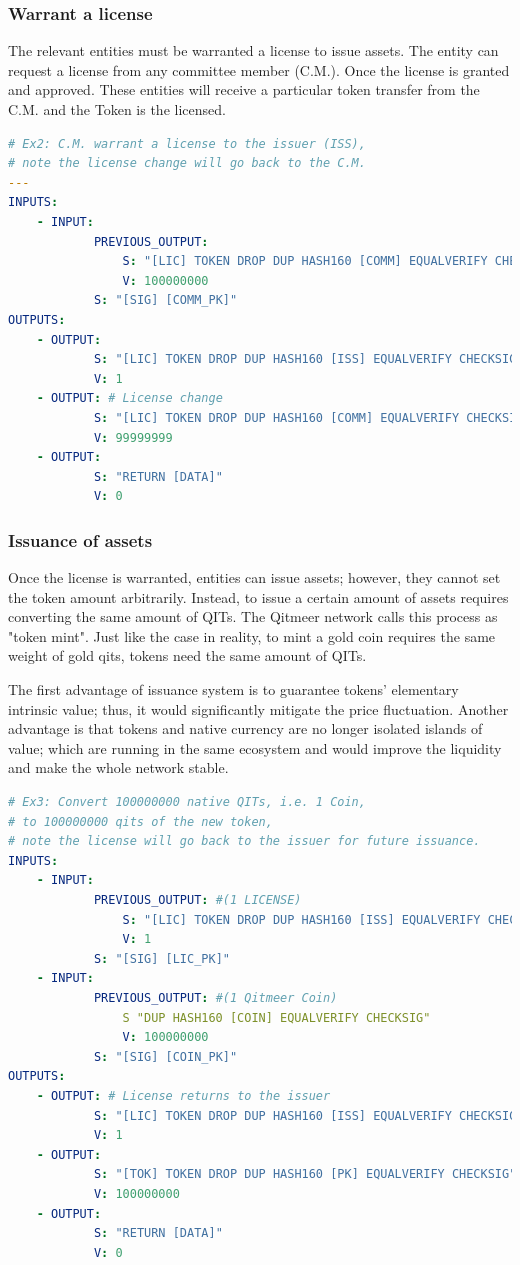 \documentclass[a4paper,11pt]{article}
\begin{document}
\subsubsection{Warrant a license}

The relevant entities must be warranted a license to issue assets. The entity can request a license from any committee member (C.M.). Once the license is granted and approved. These entities will receive a particular token transfer from the C.M. and the Token is the licensed.

\lstset{basicstyle=\tiny,style=myListStyle}
\begin{lstlisting}[language=yaml, numbers=none,basicstyle=\footnotesize]
# Ex2: C.M. warrant a license to the issuer (ISS),
# note the license change will go back to the C.M.
---
INPUTS:
	- INPUT:
			PREVIOUS_OUTPUT:
				S: "[LIC] TOKEN DROP DUP HASH160 [COMM] EQUALVERIFY CHECKSIG"
				V: 100000000
			S: "[SIG] [COMM_PK]"
OUTPUTS:
	- OUTPUT:
			S: "[LIC] TOKEN DROP DUP HASH160 [ISS] EQUALVERIFY CHECKSIG"
			V: 1
	- OUTPUT: # License change
			S: "[LIC] TOKEN DROP DUP HASH160 [COMM] EQUALVERIFY CHECKSIG"
			V: 99999999
	- OUTPUT:
			S: "RETURN [DATA]"
			V: 0
\end{lstlisting}

\subsubsection{Issuance of assets}
Once the license is warranted, entities can issue assets; however, they cannot set the token amount arbitrarily. Instead, to issue a certain amount of assets requires converting the same amount of QITs. The Qitmeer network calls this process as "token mint". Just like the case in reality, to mint a gold coin requires the same weight of gold qits, tokens need the same amount of QITs.

The first advantage of issuance system is to guarantee tokens’ elementary intrinsic value; thus, it would significantly mitigate the price fluctuation. Another advantage is that tokens and native currency are no longer isolated islands of value; which are running in the same ecosystem and would improve the liquidity and make the whole network stable.

\lstset{basicstyle=\tiny,style=myListStyle}
\begin{lstlisting}[language=yaml, numbers=none,basicstyle=\footnotesize]
# Ex3: Convert 100000000 native QITs, i.e. 1 Coin,
# to 100000000 qits of the new token,
# note the license will go back to the issuer for future issuance.
INPUTS:
	- INPUT:
			PREVIOUS_OUTPUT: #(1 LICENSE)
				S: "[LIC] TOKEN DROP DUP HASH160 [ISS] EQUALVERIFY CHECKSIG"
				V: 1
			S: "[SIG] [LIC_PK]"
	- INPUT:
			PREVIOUS_OUTPUT: #(1 Qitmeer Coin)
				S "DUP HASH160 [COIN] EQUALVERIFY CHECKSIG"
				V: 100000000
			S: "[SIG] [COIN_PK]"
OUTPUTS:
	- OUTPUT: # License returns to the issuer
			S: "[LIC] TOKEN DROP DUP HASH160 [ISS] EQUALVERIFY CHECKSIG"
			V: 1
	- OUTPUT:
			S: "[TOK] TOKEN DROP DUP HASH160 [PK] EQUALVERIFY CHECKSIG"
			V: 100000000
	- OUTPUT:
			S: "RETURN [DATA]"
			V: 0
\end{lstlisting}
\end{document}

